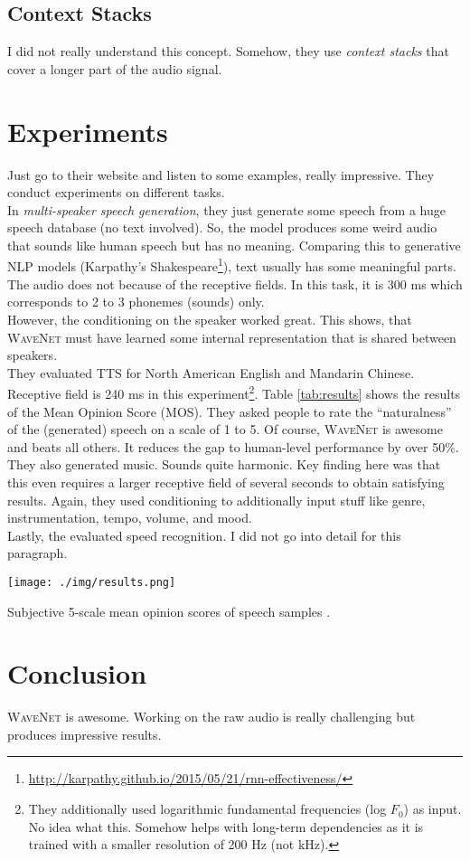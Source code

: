\subsection{Context Stacks}
\label{sec:context-stacks}
I did not really understand this concept. Somehow, they use \textit{context stacks} that cover a longer part of the audio signal.

\section{Experiments}
\label{sec:experiments}
Just go to their website and listen to some examples, really impressive. They conduct experiments on different tasks.\\
In \textit{multi-speaker speech generation}, they just generate some speech from a huge speech database (no text involved). So, the model produces some weird audio that sounds like human speech but has no meaning. Comparing this to generative NLP models (Karpathy's Shakespeare\footnote{\url{http://karpathy.github.io/2015/05/21/rnn-effectiveness/}}), text usually has some meaningful parts. The audio does not because of the receptive fields. In this task, it is 300 ms which corresponds to 2 to 3 phonemes (sounds) only.\\
However, the conditioning on the speaker worked great. This shows, that \textsc{WaveNet} must have learned some internal representation that is shared between speakers.\\
They evaluated TTS for North American English and Mandarin Chinese. Receptive field is 240 ms in this experiment\footnote{They additionally used logarithmic fundamental frequencies (log $F_0$) as input. No idea what this. Somehow helps with long-term dependencies as it is trained with a smaller resolution of 200 Hz (not kHz).}. Table \ref{tab:results} shows the results of the Mean Opinion Score (MOS). They asked people to rate the ``naturalness'' of the (generated) speech on a scale of 1 to 5. Of course, \textsc{WaveNet} is awesome and beats all others. It reduces the gap to human-level performance by over 50\%.\\
They also generated music. Sounds quite harmonic. Key finding here was that this even requires a larger receptive field of several seconds to obtain satisfying results. Again, they used conditioning to additionally input stuff like genre, instrumentation, tempo, volume, and mood.\\
Lastly, the evaluated speed recognition. I did not go into detail for this paragraph.

\begin{table}[h]
	\centering
		\texttt{[image: ./img/results.png]}
	\caption{Subjective 5-scale mean opinion scores of speech samples \parencite{oord_wavenet:_2016}.}
	\label{tab:results}
\end{table}

\section{Conclusion}
\label{sec:conclusion}
\textsc{WaveNet} is awesome. Working on the raw audio is really challenging but produces impressive results.